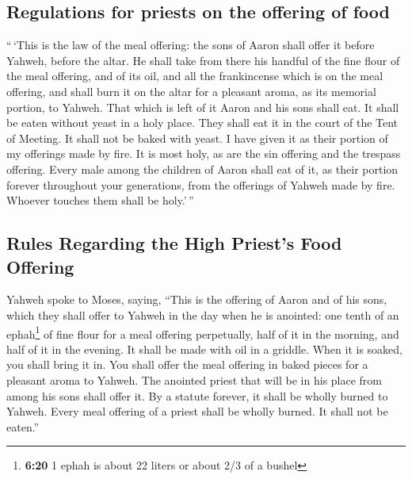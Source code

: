 \hypertarget{regulations-for-priests-on-the-offering-of-food}{%
\subsection{Regulations for priests on the offering of
food}\label{regulations-for-priests-on-the-offering-of-food}}

 ``\,`This is the law of the meal offering: the sons of
Aaron shall offer it before Yahweh, before the altar.  He
shall take from there his handful of the fine flour of the meal
offering, and of its oil, and all the frankincense which is on the meal
offering, and shall burn it on the altar for a pleasant aroma, as its
memorial portion, to Yahweh.  That which is left of it
Aaron and his sons shall eat. It shall be eaten without yeast in a holy
place. They shall eat it in the court of the Tent of Meeting.
 It shall not be baked with yeast. I have given it as
their portion of my offerings made by fire. It is most holy, as are the
sin offering and the trespass offering.  Every male among
the children of Aaron shall eat of it, as their portion forever
throughout your generations, from the offerings of Yahweh made by fire.
Whoever touches them shall be holy.'\,''

\hypertarget{rules-regarding-the-high-priests-food-offering}{%
\subsection{Rules Regarding the High Priest's Food
Offering}\label{rules-regarding-the-high-priests-food-offering}}

 Yahweh spoke to Moses, saying,  ``This is
the offering of Aaron and of his sons, which they shall offer to Yahweh
in the day when he is anointed: one tenth of an ephah\footnote{\textbf{6:20}
  1 ephah is about 22 liters or about 2/3 of a bushel} of fine flour for
a meal offering perpetually, half of it in the morning, and half of it
in the evening.  It shall be made with oil in a griddle.
When it is soaked, you shall bring it in. You shall offer the meal
offering in baked pieces for a pleasant aroma to Yahweh. 
The anointed priest that will be in his place from among his sons shall
offer it. By a statute forever, it shall be wholly burned to Yahweh.
 Every meal offering of a priest shall be wholly burned.
It shall not be eaten.''

